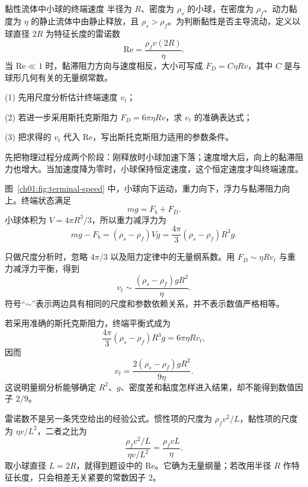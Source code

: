 \begin{origexamplebox}{黏性流体中小球的终端速度}
半径为 $R$、密度为 $\rho_s$ 的小球，在密度为 $\rho_f$、动力黏度为 $\eta$ 的静止流体中由静止释放，且 $\rho_s>\rho_f$。为判断黏性是否主导流动，定义以球直径 $2R$ 为特征长度的雷诺数
\[
 \mathrm{Re}=\frac{\rho_fv(2R)}{\eta}.
\]
当 $\mathrm{Re}\ll1$ 时，黏滞阻力方向与速度相反，大小可写成 $F_D=C\eta Rv$，其中 $C$ 是与球形几何有关的无量纲常数。

(1) 先用尺度分析估计终端速度 $v_t$；

(2) 若进一步采用斯托克斯阻力 $F_D=6\pi\eta Rv$，求 $v_t$ 的准确表达式；

(3) 把求得的 $v_t$ 代入 $\mathrm{Re}$，写出斯托克斯阻力适用的参数条件。
\end{origexamplebox}
\begin{xesolution}
先把物理过程分成两个阶段：刚释放时小球加速下落；速度增大后，向上的黏滞阻力也增大。当加速度降为零时，小球保持恒定速度，这个恒定速度才叫终端速度。

图~\ref{ch01:fig:terminal-speed} 中，小球向下运动，重力向下，浮力与黏滞阻力向上。终端状态满足
\begin{equation}
 mg=F_b+F_D.
\end{equation}
小球体积为 $V=4\pi R^3/3$，所以重力减浮力为
\[
 mg-F_b=(\rho_s-\rho_f)Vg
 =\frac{4\pi}{3}(\rho_s-\rho_f)R^3g.
\]

只做尺度分析时，忽略 $4\pi/3$ 以及阻力定律中的无量纲系数。用
$F_D\sim\eta Rv_t$ 与重力减浮力平衡，得到
\begin{equation}
 \boxed{v_t\sim\frac{(\rho_s-\rho_f)gR^2}{\eta}}.
\end{equation}
符号“$\sim$”表示两边具有相同的尺度和参数依赖关系，并不表示数值严格相等。

若采用准确的斯托克斯阻力，终端平衡式成为
\[
 \frac{4\pi}{3}(\rho_s-\rho_f)R^3g=6\pi\eta Rv_t,
\]
因而
\begin{equation}
 \boxed{v_t=\frac{2(\rho_s-\rho_f)gR^2}{9\eta}}.
\end{equation}
这说明量纲分析能够确定 $R^2$、$g$、密度差和黏度怎样进入结果，却不能得到数值因子 $2/9$。

雷诺数不是另一条凭空给出的经验公式。惯性项的尺度为
$\rho_fv^2/L$，黏性项的尺度为 $\eta v/L^2$，二者之比为
\[
 \frac{\rho_fv^2/L}{\eta v/L^2}=\frac{\rho_fvL}{\eta}.
\]
取小球直径 $L=2R$，就得到题设中的 $\mathrm{Re}$。它确为无量纲量；若改用半径 $R$ 作特征长度，只会相差无关紧要的常数因子 $2$。


\end{xesolution}
